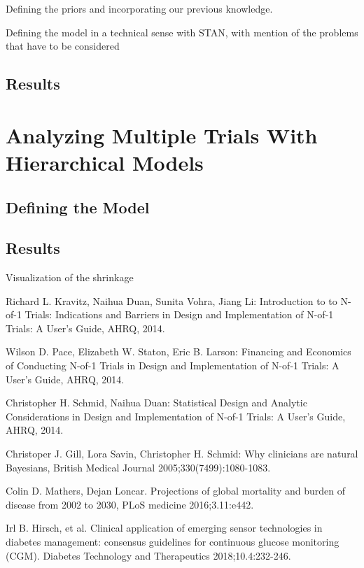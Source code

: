 \documentclass[12pt,a4paper,leqno]{report}
\theoremstyle{plain}
\theoremstyle{definition}
\theoremstyle{remark}
\begin{document}
Defining the priors and incorporating our previous knowledge.

Defining the model in a technical sense with STAN, with mention of the problems that
have to be considered

\subsection{Results}\label{1results}

\section{Analyzing Multiple Trials With Hierarchical Models}\label{pooling}

\subsection{Defining the Model}\label{hiermodel}

\subsection{Results}\label{hierresults}

Visualization of the shrinkage


\begin{thebibliography}{4}

    Richard L. Kravitz, Naihua Duan, Sunita Vohra, Jiang Li: Introduction to to N-of-1 Trials: Indications and Barriers in Design and Implementation of N-of-1 Trials: A User's Guide, AHRQ, 2014.

    Wilson D. Pace, Elizabeth W. Staton, Eric B. Larson: Financing and Economics of Conducting N-of-1 Trials in Design and Implementation of N-of-1 Trials: A User's Guide, AHRQ, 2014.

    Christopher H. Schmid, Naihua Duan: Statistical Design and Analytic Considerations in Design and Implementation of N-of-1 Trials: A User's Guide, AHRQ, 2014.

    Christoper J. Gill, Lora Savin, Christopher H. Schmid: Why clinicians are natural Bayesians, British Medical Journal 2005;330(7499):1080-1083.

    Colin D. Mathers, Dejan Loncar. Projections of global mortality and burden of disease from 2002 to 2030, PLoS medicine 2016;3.11:e442.

    Irl B. Hirsch, et al. Clinical application of emerging sensor technologies in diabetes management: consensus guidelines for continuous glucose monitoring (CGM). Diabetes Technology and Therapeutics 2018;10.4:232-246.

\end{thebibliography}
\end{document}
